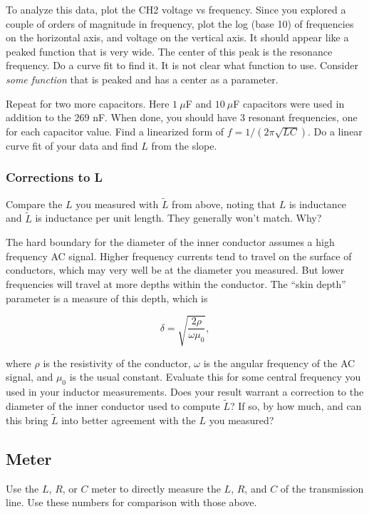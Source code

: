 \documentclass[12pt]{article}
\begin{document}
To analyze this data, plot the CH2 voltage vs frequency.  Since you explored a couple of orders of magnitude in frequency, plot the log (base 10) of frequencies on the horizontal axis, and voltage on the vertical axis. It should appear like a peaked function that is very wide.  The center of this peak is the resonance frequency. Do a curve fit to find it. It is not clear what function to use. Consider {\sl some function} that is peaked and has a center as a parameter.

Repeat for two more capacitors. Here $1\ \mu$F and $10\ \mu$F capacitors were used in addition to the $269$ nF. When done, you should have 3 resonant frequencies, one for each capacitor value.  Find a linearized form of $f=1/(2\pi\sqrt{LC})$. Do a linear curve fit of your data and find $L$ from the slope.

\subsubsection{Corrections to L}

Compare the $L$ you measured with ${\tilde L}$ from above, noting that $L$ is inductance and ${\tilde L}$ is inductance per unit length. They generally won't match. Why? 

The hard boundary for the diameter of the inner conductor assumes a high frequency AC signal. Higher frequency currents tend to travel on the surface of conductors, which may very well be at the diameter you measured.  But lower frequencies will travel at more depths within the conductor.  The ``skin depth'' parameter is a measure of this depth, which is

\begin{equation}
\delta=\sqrt{\frac{2\rho}{\omega \mu_0}},
\end{equation}

where $\rho$ is the resistivity of the conductor, $\omega$ is the angular frequency of the AC signal, and $\mu_0$ is the usual constant. Evaluate this for some central frequency you used in your inductor measurements. Does your result warrant a correction to the diameter of the inner conductor used to compute ${\tilde L}$? If so, by how much, and can this bring ${\tilde L}$ into better agreement with the $L$ you measured?

\subsection{Meter}

Use the $L$, $R$, or $C$ meter to directly measure the $L$, $R$, and $C$ of the transmission line.  Use these numbers for comparison with those above. 
\end{document}
